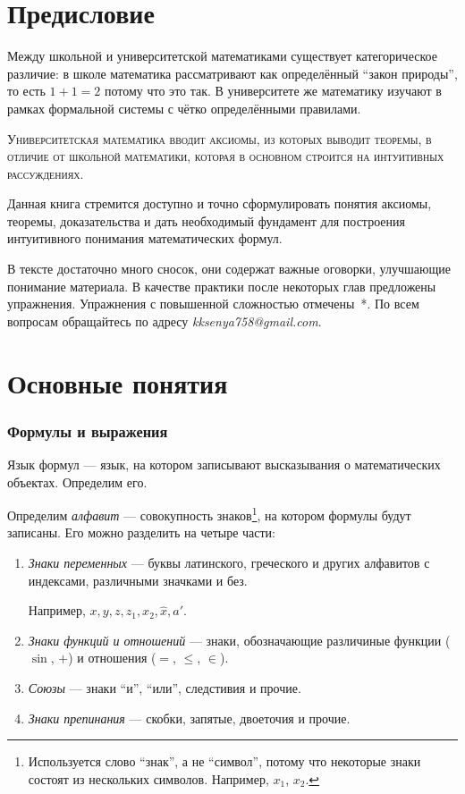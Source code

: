 \part{Предисловие}

Между школьной и университетской математиками существует категорическое
различие: в школе математика рассматривают как определённый ``закон природы'',
то есть $1+1=2$ потому что это так. В университете же математику изучают
в рамках формальной системы с чётко определёнными правилами.

\textsc{Университетская математика вводит аксиомы, из которых выводит теоремы,
  в отличие от школьной математики, которая
  в основном строится на интуитивных рассуждениях.}

Данная книга стремится доступно и точно сформулировать понятия аксиомы,
теоремы, доказательства и дать необходимый фундамент для построения
интуитивного понимания математических формул.

В тексте достаточно много сносок, они содержат важные оговорки,
улучшающие понимание материала. В качестве практики
после некоторых глав предложены упражнения. Упражнения с повышенной сложностью
отмечены~*.
По всем вопросам обращайтесь по адресу {\sl kksenya758@gmail.com}.

\part{Основные понятия}

\section{Формулы и выражения}

Язык формул --- язык, на котором записывают высказывания о математических
объектах. Определим его.

Определим {\it алфавит} --- совокупность знаков\footnote{
  Используется слово ``знак'', а не ``символ'', потому что некоторые знаки
  состоят из нескольких символов. Например, $x_1$, $x_2$.},
на котором формулы будут записаны. Его можно разделить на четыре части:
\begin{enumerate}
  \item{}{\it Знаки переменных} --- буквы латинского,
  греческого и других алфавитов с индексами, различными значками и без.

  Например, $x,y,z,z_1,x_2,\hat x,a'$.

  \item{}{\it Знаки функций и отношений}
  --- знаки, обозначающие
  различиные функции ($\sin$, $+$) и отношения ($=$, $\leq$, $\in$).

  \item{}{\it Союзы}
  --- знаки ``и'', ``или'', следстивия и прочие.

  \item{}{\it Знаки препинания} --- скобки,
  запятые, двоеточия и прочие.
\end{enumerate}

